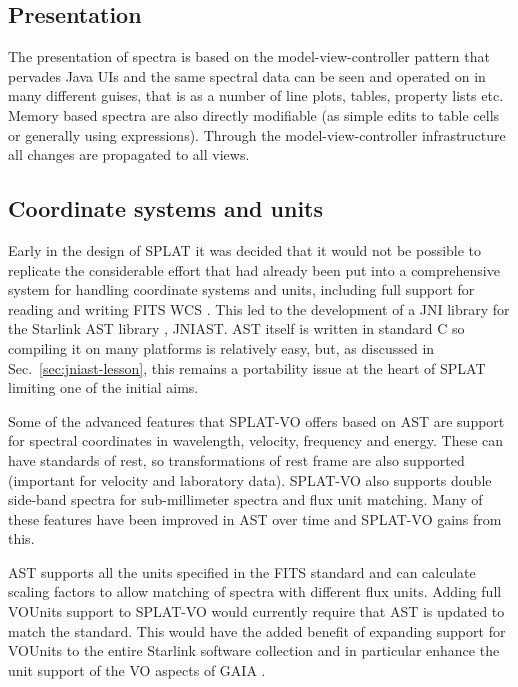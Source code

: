 \documentclass[final,authoryear,5p,times,twocolumn]{elsarticle}
\begin{document}
\subsection{Presentation}

The presentation of spectra is based on the model-view-controller pattern that
pervades Java UIs and the same spectral data can be seen and operated on in
many different guises, that is as a number of line plots, tables, property
lists etc. Memory based spectra are also directly modifiable (as simple edits
to table cells or generally using expressions). Through the
model-view-controller infrastructure all changes are propagated to all views.


\subsection{Coordinate systems and units}

Early in the design of SPLAT it was decided that it would not be possible to
replicate the considerable effort that had already been put into a
comprehensive system for handling coordinate systems and units, including full
support for reading and writing FITS WCS \citep{2006A&A...446..747G}. This led to the development of a JNI
library for the Starlink AST library \citep[][]{1998ASPC..145...41W,2012ASPC..461..825B}, JNIAST. AST
itself is written in standard C so compiling it on many platforms is
relatively easy, but, as discussed in Sec.\ \ref{sec:jniast-lesson}, this remains a portability issue at the heart of SPLAT
limiting one of the initial aims.

Some of the advanced features that SPLAT-VO offers based on AST are support
for spectral coordinates in wavelength, velocity, frequency and energy. These
can have standards of rest, so transformations of rest frame are also
supported (important for velocity and laboratory data). SPLAT-VO also supports
double side-band spectra for sub-millimeter spectra and flux unit matching. Many of these features
have been improved in AST over time and SPLAT-VO gains from this.

AST supports all the units specified in the FITS standard
\citep{2010A&A...524A..42P} and can calculate scaling factors to allow
matching of spectra with different flux units. Adding full VOUnits
support \citep{vounits} to SPLAT-VO would currently require that AST
is updated to match the standard. This would have the added benefit of
expanding support for VOUnits to the entire Starlink software
collection and in particular enhance the unit support of the VO
aspects of GAIA \citep{2009ASPC..411..575D}.
\end{document}
